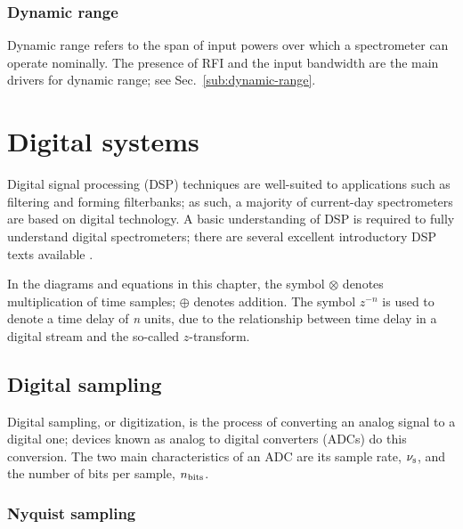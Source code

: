 \documentclass{ws-rv961x669}
\begin{document}
\subsubsection{Dynamic range}
Dynamic range refers to the span of input powers over which a spectrometer can operate nominally. The presence of RFI and the input bandwidth are the main drivers for dynamic range; see Sec.~\ref{sub:dynamic-range}.




\section{Digital systems}

Digital signal processing (DSP) techniques are well-suited to applications such as filtering and forming filterbanks; as such, a majority of current-day spectrometers are based on digital technology. A basic understanding of DSP is required to fully understand digital spectrometers; there are several excellent introductory DSP texts available \cite{Lyons:2000uy, BookSmithFFT}. 

In the diagrams and equations in this chapter, the symbol $\otimes$ denotes multiplication of time samples; $\oplus$ denotes addition. The symbol $z^{-n}$ is used to denote a time delay of \emph{n} units, due to the relationship between time delay in a digital stream and the so-called $z$-transform.


\subsection{Digital sampling}

Digital sampling, or digitization, is the process of converting an analog signal to a digital one; devices known as analog to digital converters (ADCs) do this conversion. The two main characteristics of an ADC are its sample rate, $\nu_{\rm{s}}$, and the number of bits per sample, $n_{\rm{bits}}$.

\subsubsection{Nyquist sampling \label{sub:sampling}}
\end{document}
